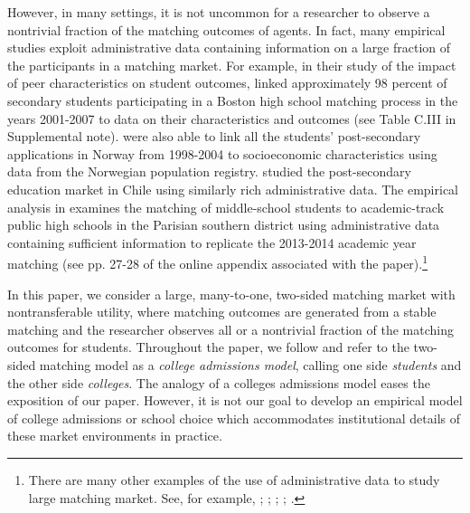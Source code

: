 \documentclass[12pt, fullpage]{amsart}
\theoremstyle{definition}
\theoremstyle{definition}
\theoremstyle{definition}
\begin{document}
\begin{bibunit}[econometrica]
    However, in many settings, it is not uncommon for a researcher to observe a nontrivial fraction of the matching outcomes of agents. In fact, many empirical studies exploit administrative data containing information on a large fraction of the participants in a matching market. For example, in their study of the impact of peer characteristics on student outcomes, \cite{Abdulkadiroglu/Angrist/Pathak:2014:ECTA} linked approximately 98 percent of secondary students participating in a Boston high school matching process in the years 2001-2007 to  data on their characteristics and outcomes (see Table C.III in Supplemental note).    
 \cite{Kirkeboen/Leuven/Mogstad:16:QJE} were also able to link all the students'  post-secondary applications in Norway from 1998-2004 to socioeconomic characteristics using data from the Norwegian population registry. \cite{Hastings/Neilson/Zimmerman:2013} studied the post-secondary education market in Chile using similarly rich administrative data.  The empirical analysis in \cite{Fack/Grenet/He:AER:2019} examines the matching of middle-school students to  academic-track public high schools in the Parisian southern district using administrative data containing sufficient information to replicate the 2013-2014 academic year matching (see pp. 27-28 of the online appendix associated with the paper).\footnote{There are many other examples of the use of administrative data to study large matching market. See, for example, \cite{Boyd/Lankford/Loeb/Wyckoff:13:JLE}; \citet{Abdulkadiroglu/Agarwal/Pathak:2017:AER}; \cite{Agarwal/Somaini:2018:ECTA}; \cite{Luflade:2018:WP}; \cite{Casamiglia/Fu/Guell:2020:JPE}.}    
 
    In this paper, we consider a large, many-to-one, two-sided matching market with nontransferable utility, where matching outcomes are generated from a stable matching and the researcher observes all or a nontrivial fraction of the matching outcomes for students.  Throughout the paper, we follow \cite{Roth/Sotomayor:90:TwoSidedMatching} and refer to the two-sided matching model as a \textit{college admissions model}, calling one side \textit{students} and the other side \textit{colleges}. The analogy of a colleges admissions model eases the exposition of our paper. However, it is not our goal to develop an empirical model of college admissions or school choice which accommodates institutional details of these market environments in practice. 
    

\end{bibunit}
\end{document}
